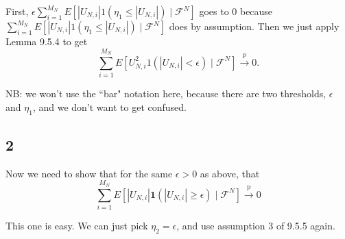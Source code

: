 \documentclass{article}
\begin{document}
First, $\epsilon \sum_{i=1}^{M_N} E\left[ |U_{N,i}|1(\eta_1 \le  |U_{N,i}| ) \mid \mathcal{F}^N \right]$ goes to $0$ because $\sum_{i=1}^{M_N} E\left[ |U_{N,i}|1(\eta_1 \le  |U_{N,i}| ) \mid \mathcal{F}^N \right]$ does by assumption. Then we just apply Lemma 9.5.4 to get
$$
\sum_{i=1}^{M_N} E\left[ U^2_{N,i}1( |U_{N,i}| < \epsilon ) \mid \mathcal{F}^N \right] \overset{p}{\to} 0.
$$

NB: we won't use the ``bar" notation here, because there are two thresholds, $\epsilon$ and $\eta_1$, and we don't want to get confused. 

\subsection*{2}

Now we need to show that for the same $\epsilon > 0$ as above, that
$$
\sum_{i=1}^{M_N}E[ |U_{N,i}| \mathbf{1}( |U_{N,i}| \ge \epsilon) \mid \mathcal{F}^N ] \overset{\text{p}}{\to} 0
$$

This one is easy. We can just pick $\eta_2 = \epsilon$, and use assumption 3 of 9.5.5 again.
    
\end{document}
